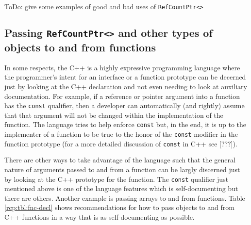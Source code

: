 ToDo: give some examples of good and bad uses of \texttt{RefCountPtr<>}

%
\subsection{Passing \texttt{RefCountPtr<>} and other types of objects to and from functions}
%

In some respects, the C++ is a highly expressive programming language
where the programmer's intent for an interface or a function prototype
can be decerned just by looking at the C++ declaration and not even
needing to look at auxiliary documentation.  For example, if a
reference or pointer argument into a function has the \texttt{const}
qualifier, then a developer can automatically (and rightly) assume
that that argument will not be changed within the implementation of
the function.  The language tries to help enforce \texttt{const} but,
in the end, it is up to the implementer of a function to be true to
the honor of the \texttt{const} modifier in the function prototype
(for a more detailed discussion of \texttt{const} in C++ see [???]).

There are other ways to take advantage of the language such that the
general nature of arguments passed to and from a function can be
largly discerned just by looking at the C++ prototype for the
function.  The \texttt{const} qualifier just mentioned above is one of
the language features which is self-documenting but there are others.
Another example is passing arrays to and from functions.  Table
\ref{rcp:tbl:fnc-decl} shows recommendations for how to pass objects
to and from C++ functions in a way that is as self-documenting as
possible.

